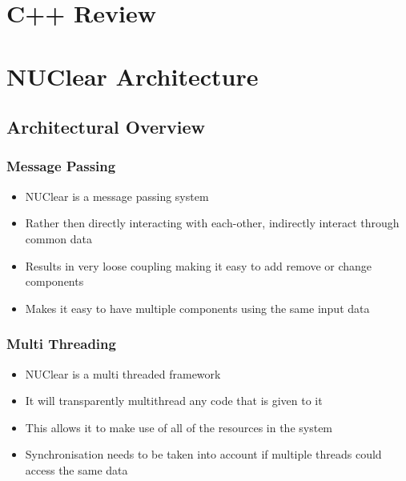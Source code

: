\documentclass{beamer}
\begin{document}
\section{C++ Review}

\section{NUClear Architecture}
\subsection{Architectural Overview}
\begin{frame}
	\frametitle{Message Passing}
	\begin{itemize}
		\item NUClear is a message passing system
		\item Rather then directly interacting with each-other, indirectly interact through common data
		\item Results in very loose coupling making it easy to add remove or change components
		\item Makes it easy to have multiple components using the same input data
	\end{itemize}
\end{frame}

\begin{frame}
	\frametitle{Multi Threading}
	\begin{itemize}
		\item NUClear is a multi threaded framework
		\item It will transparently multithread any code that is given to it
		\item This allows it to make use of all of the resources in the system
		\item Synchronisation needs to be taken into account if multiple threads could access the same data
	\end{itemize}
\end{frame}
\end{document}

